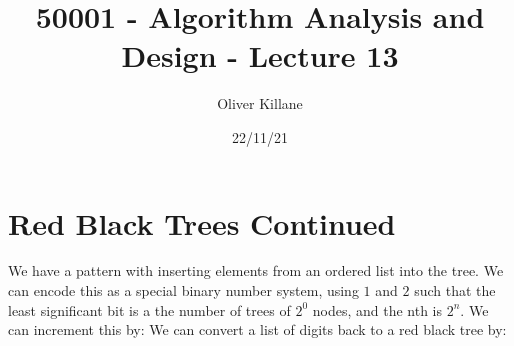 \documentclass{report}
\title{50001 - Algorithm Analysis and Design - Lecture 13}
\author{Oliver Killane}
\date{22/11/21}
\begin{document}
\maketitle
{}

\section*{Red Black Trees Continued}
We have a pattern with inserting elements from an ordered list into the tree.
We can encode this as a special binary number system, using $1$ and $2$ such that the least significant bit is a the number of trees of $2^0$ nodes, and the nth is $2^n$.
We can increment this by:
We can convert a list of digits back to a red black tree by:
\end{document}
